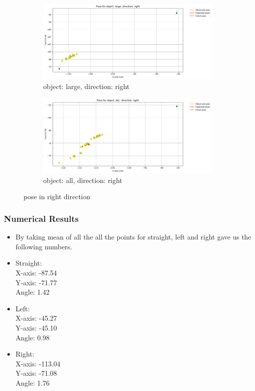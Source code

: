 \documentclass[10pt,a4paper]{article}
\begin{document}
\begin{itemize}
\begin{figure}[H]
									\begin{subfigure}{0.5\textwidth}
										\centering
										\includegraphics[width=0.8\linewidth]{img/pose_large_right.png}
										\caption{object: large, direction: right}
										\label{fig:object: large, direction: right}
									\end{subfigure}%
									\begin{subfigure}{0.5\textwidth}
										\centering
										\includegraphics[width=0.8\linewidth]{img/pose_all_right.png}
										\caption{object: all, direction: right}
										\label{fig:object: all, direction: right}
									\end{subfigure}
									
									\caption{pose in right direction}
									\label{fig:pose in right direction}
								\end{figure}

							\end{itemize}	
					\subsubsection{Numerical Results}
							\begin{itemize}
							\item By taking mean of all the all the points for straight, left and right gave us the following numbers. 
							\item Straight: \\
									X-axis: -87.54 \\
									Y-axis: -71.77 \\
									Angle: 1.42	
							\item Left:\\
									X-axis: -45.27\\
									Y-axis: -45.10 \\
									Angle: 0.98
							\item Right:\\
									X-axis: -113.04\\
									Y-axis: -71.08 \\
									Angle: 1.76

							\end{itemize}		
					
\end{document}
